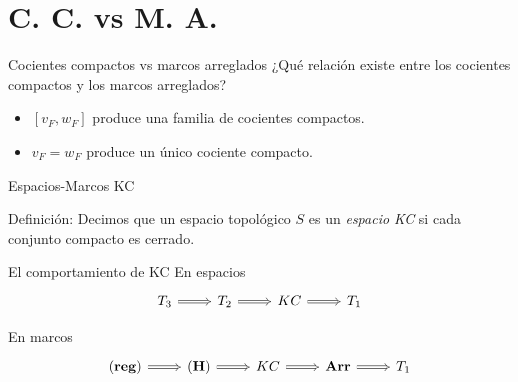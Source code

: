 \documentclass[compress,12pt]{beamer}
\begin{document}
\section{C. C. vs M. A.}
\begin{frame}{Cocientes compactos vs marcos arreglados}
¿Qué relación existe entre los cocientes compactos y los marcos arreglados?

\begin{itemize}
    \item<3-> $[v_F, w_F]$ produce una familia de cocientes compactos.
    \item<4-> $v_F=w_F$ produce un único cociente compacto.  
\end{itemize}

\end{frame}

\begin{frame}{Espacios-Marcos KC}
\begin{block}{Definición:}
Decimos que un espacio topológico $S$ es un \emph{ espacio KC} si cada conjunto compacto es cerrado. 
\end{block}


\end{frame}

\begin{frame}[fragile]{El comportamiento de KC}
En espacios
\[\begin{tikzcd}
	{T_3} & {T_2} & KC & {T_1}
	\arrow[Rightarrow, from=1-1, to=1-2]
	\arrow[Rightarrow, from=1-2, to=1-3]
	\arrow[Rightarrow, from=1-3, to=1-4]
\end{tikzcd}\]

En marcos
\[\begin{tikzcd}
	{\mathbf{(reg)}} & {\mathbf{(H)}} & KC & {\mathbf{Arr}} & {T_1}
	\arrow[Rightarrow, from=1-1, to=1-2]
	\arrow[Rightarrow, from=1-2, to=1-3]
	\arrow[Rightarrow, from=1-3, to=1-4]
	\arrow[Rightarrow, from=1-4, to=1-5]
\end{tikzcd}\]
\end{frame}
\end{document}
